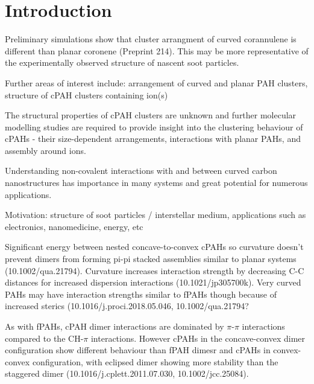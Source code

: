 \newcommand{\curPAHAP}{curPAHIP\xspace} 
%
\section{Introduction}
\label{sec:Introduction}
% 




Preliminary simulations show that cluster arrangment of curved corannulene is different than planar coronene (Preprint 214). This may be more representative of the experimentally observed structure of nascent soot particles.

Further areas of interest include: arrangement of curved and planar PAH clusters, structure of cPAH clusters containing ion(s)

The structural properties of cPAH clusters are unknown and further molecular modelling studies are required to provide insight into the clustering behaviour of cPAHs - their size-dependent arrangements, interactions with planar PAHs, and assembly around ions.

Understanding non-covalent interactions with and between curved carbon nanostructures has importance in many systems and great potential for numerous applications.

Motivation: structure of soot particles / interstellar medium, applications such as electronics, nanomedicine, energy, etc



Significant energy between nested concave-to-convex cPAHs so curvature doesn't prevent dimers from forming pi-pi stacked assemblies similar to planar systems (10.1002/qua.21794). Curvature increases interaction strength by decreasing C-C distances for increased dispersion interactions (10.1021/jp305700k). Very curved PAHs may have interaction strengths similar to fPAHs though because of increased sterics (10.1016/j.proci.2018.05.046, 10.1002/qua.21794?

As with fPAHs, cPAH dimer interactions are dominated by $\pi$-$\pi$ interactions compared to the CH-$\pi$ interactions. However cPAHs in the concave-convex dimer configuration show different behaviour than fPAH dimesr and cPAHs in convex-convex configuration, with eclipsed dimer showing more stability than the staggered dimer (10.1016/j.cplett.2011.07.030, 10.1002/jcc.25084).


